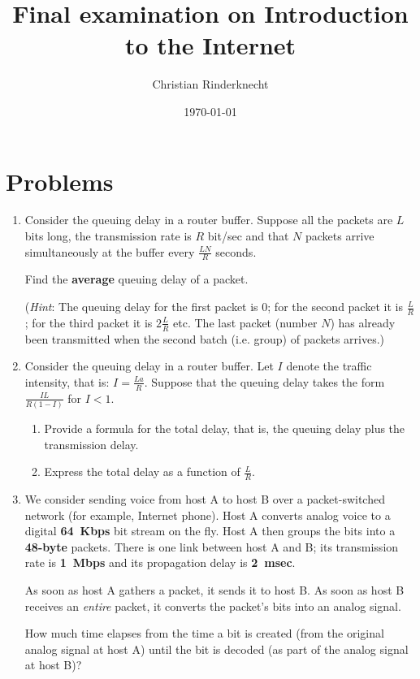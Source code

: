\documentclass[12pt,a4paper]{article}
\title{Final examination on Introduction to the Internet}
\author{Christian Rinderknecht}
\date{\today}
\begin{document}
\maketitle

\section{Problems}

\begin{enumerate}

  \item Consider the queuing delay in a router buffer. Suppose all the
    packets are \(L\) bits long, the transmission rate is \(R\)
    bit/sec and that \(N\) packets arrive simultaneously at the buffer
    every \(\frac{LN}{R}\) seconds.

    Find the \textbf{average} queuing delay of a packet.

    (\emph{Hint}: The queuing delay for the first packet is 0; for the
    second packet it is \(\frac{L}{R}\); for the third packet it is
    \(2{\frac{L}{R}}\) etc. The last packet (number \(N\)) has already
    been transmitted when the second batch (i.e. group) of packets
    arrives.)

  \item Consider the queuing delay in a router buffer. Let \(I\)
    denote the traffic intensity, that is: \(I =
    \frac{La}{R}\). Suppose that the queuing delay takes the form
    \(\frac{IL}{R(1-I)}\) for \(I < 1\).
    \begin{enumerate}

      \item Provide a formula for the total delay, that is, the
        queuing delay plus the transmission delay.

      \item Express the total delay as a function of \(\frac{L}{R}\).    

    \end{enumerate}

  \item We consider sending voice from host A to host B over a
    packet-switched network (for example, Internet phone). Host A
    converts analog voice to a digital \textbf{64~Kbps} bit stream on
    the fly. Host A then groups the bits into a \textbf{48-byte}
    packets. There is one link between host A and B; its transmission
    rate is \textbf{1~Mbps} and its propagation delay is
    \textbf{2~msec}. 

    As soon as host A gathers a packet, it sends it to host B. As soon
    as host B receives an \emph{entire} packet, it converts the
    packet's bits into an analog signal.

    How much time elapses from the time a bit is created (from the
    original analog signal at host A) until the bit is decoded (as
    part of the analog signal at host B)?

\end{enumerate}
\end{document}
